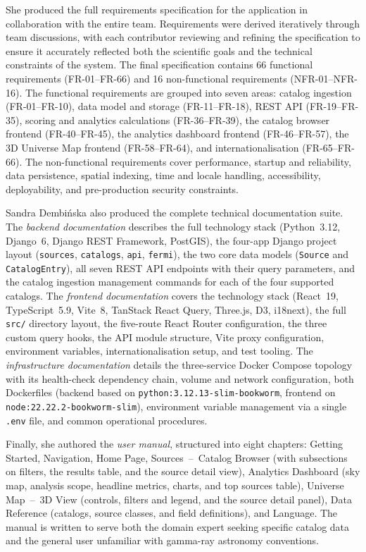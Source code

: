 \documentclass[11pt, a4paper]{article}
\begin{document}
She produced the full requirements specification for the application in collaboration with the entire team.
Requirements were derived iteratively through team discussions, with each contributor reviewing and refining the specification to ensure it accurately reflected both the scientific goals and the technical constraints of the system.
The final specification contains 66 functional requirements (FR-01–FR-66) and 16 non-functional requirements (NFR-01–NFR-16).
The functional requirements are grouped into seven areas: catalog ingestion (FR-01–FR-10), data model and storage (FR-11–FR-18), REST API (FR-19–FR-35), scoring and analytics calculations (FR-36–FR-39), the catalog browser frontend (FR-40–FR-45), the analytics dashboard frontend (FR-46–FR-57), the 3D Universe Map frontend (FR-58–FR-64), and internationalisation (FR-65–FR-66).
The non-functional requirements cover performance, startup and reliability, data persistence, spatial indexing, time and locale handling, accessibility, deployability, and pre-production security constraints.

Sandra Dembińska also produced the complete technical documentation suite.
The \emph{backend documentation} describes the full technology stack (Python~3.12, Django~6, Django REST Framework, PostGIS), the four-app Django project layout (\texttt{sources}, \texttt{catalogs}, \texttt{api}, \texttt{fermi}), the two core data models (\texttt{Source} and \texttt{CatalogEntry}), all seven REST API endpoints with their query parameters, and the catalog ingestion management commands for each of the four supported catalogs.
The \emph{frontend documentation} covers the technology stack (React~19, TypeScript~5.9, Vite~8, TanStack React Query, Three.js, D3, i18next), the full \texttt{src/} directory layout, the five-route React Router configuration, the three custom query hooks, the API module structure, Vite proxy configuration, environment variables, internationalisation setup, and test tooling.
The \emph{infrastructure documentation} details the three-service Docker Compose topology with its health-check dependency chain, volume and network configuration, both Dockerfiles (backend based on \texttt{python:3.12.13-slim-bookworm}, frontend on \texttt{node:22.22.2-bookworm-slim}), environment variable management via a single \texttt{.env} file, and common operational procedures.

Finally, she authored the \emph{user manual}, structured into eight chapters: Getting Started, Navigation, Home Page, Sources~--~Catalog Browser (with subsections on filters, the results table, and the source detail view), Analytics Dashboard (sky map, analysis scope, headline metrics, charts, and top sources table), Universe Map~--~3D View (controls, filters and legend, and the source detail panel), Data Reference (catalogs, source classes, and field definitions), and Language.
The manual is written to serve both the domain expert seeking specific catalog data and the general user unfamiliar with gamma-ray astronomy conventions.
\end{document}
